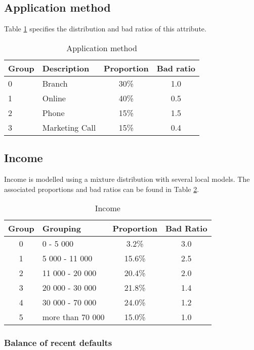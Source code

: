 \documentclass{article}
\theoremstyle{def}
\begin{document}
\subsection{Application method}

Table \ref{AppMeth_param} specifies the distribution and bad ratios of this attribute.
\begin{table}[H]%
\caption{Application method}
\label{AppMeth_param}
\centering
\small
\begin{tabular}{llcc}
\hline
Group & Description & Proportion & Bad ratio \\
\hline
0 & Branch & 30\%  & 1.0\\
1 & Online & 40\%  & 0.5\\
2 & Phone & 15\% & 1.5\\
3 & Marketing Call & 15\% & 0.4\\
\hline
\end{tabular}
\end{table}  

\subsection{Income}

Income is modelled using a mixture distribution with several local models. The associated proportions and bad ratios can be found in Table \ref{Inc_param}.
\begin{table}[H]%
\caption{Income}
\label{Inc_param}
\centering
\small
\begin{tabular}{clcc}
\hline
Group & Grouping & Proportion & Bad Ratio \\
\hline
0 & 0 - 5 000 & 3.2\% & 3.0\\
1 & 5 000 - 11 000 & 15.6\% & 2.5\\
2 & 11 000 - 20 000 & 20.4\% & 2.0\\
3 & 20 000 - 30 000 & 21.8\% & 1.4\\
4 & 30 000 - 70 000 & 24.0\% & 1.2\\
5 & more than 70 000 & 15.0\% & 1.0\\
\hline
\end{tabular}
\end{table}

\subsubsection{Balance of recent defaults}
\end{document}
